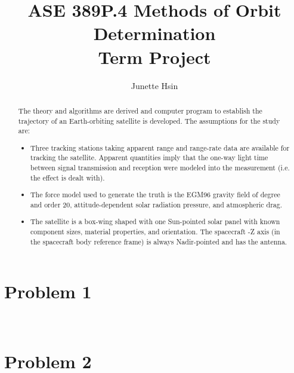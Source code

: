 \documentclass[conf]{new-aiaa}
\title{ASE 389P.4 Methods of Orbit Determination \\ Term Project}
\author{Junette Hsin}
\affil{Masters Student, Aerospace Engineering and Engineering Mechanics, University of Texas, Austin, TX 78712}
\begin{document}
\maketitle

\begin{abstract}
	The theory and algorithms are derived and computer program to establish the trajectory of
	an Earth-orbiting satellite is developed. The assumptions for the study are:
	
	\begin{itemize}
		\item Three tracking stations taking apparent range and range-rate data are available for tracking the	satellite. Apparent quantities imply that the one-way light time between signal transmission and reception were modeled into the measurement (i.e. the effect is dealt with).
		\item The force model used to generate the truth is the EGM96 gravity field of degree and order 20,
		attitude-dependent solar radiation pressure, and atmospheric drag.
		\item The satellite is a box-wing shaped with one Sun-pointed solar panel with known component sizes, material properties, and orientation. The spacecraft -Z axis (in the spacecraft body reference frame) is always Nadir-pointed and has the antenna.
	\end{itemize}
	

\end{abstract}



\section*{Problem 1}

\begin{center}
 \\
\end{center}


\section*{Problem 2}
\end{document}
